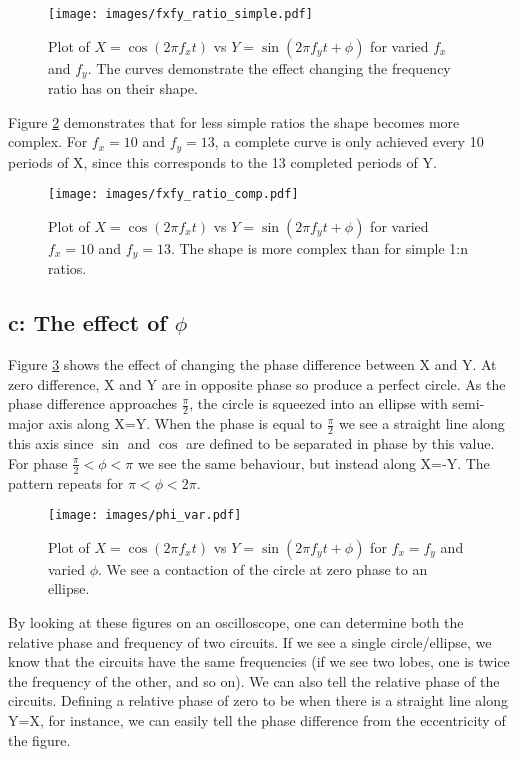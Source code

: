\documentclass{article}
\begin{document}
\begin{figure}[h]
\centering
\texttt{[image: images/fxfy\_ratio\_simple.pdf]}
\caption{Plot of $X = \cos(2\pi f_x t)$ vs $Y = \sin(2\pi f_y t + \phi)$ for varied $f_x$ and $f_y$. The curves demonstrate the effect changing the frequency ratio has on their shape.}
\label{fig:ratiosimp}
\end{figure}

Figure \ref{fig:ratiocomp} demonstrates that for less simple ratios the shape becomes more complex. For $f_x=10$ and $f_y=13$, a complete curve is only achieved every 10 periods of X, since this corresponds to the 13 completed periods of Y.

\begin{figure}[h]
\centering
\texttt{[image: images/fxfy\_ratio\_comp.pdf]}
\caption{Plot of $X = \cos(2\pi f_x t)$ vs $Y = \sin(2\pi f_y t + \phi)$ for varied $f_x=10$ and $f_y=13$. The shape is more complex than for simple 1:n ratios.}
\label{fig:ratiocomp}
\end{figure}
\clearpage

\subsection*{c: The effect of $\phi$}

Figure \ref{fig:phi} shows the effect of changing the phase difference between X and Y. At zero difference, X and Y are in opposite phase so produce a perfect circle. As the phase difference approaches $\frac{\pi}{2}$, the circle is squeezed into an ellipse with semi-major axis along X=Y. When the phase is equal to $\frac{\pi}{2}$ we see a straight line along this axis since $\sin$ and $\cos$ are defined to be separated in phase by this value. For phase $\frac{\pi}{2} < \phi < \pi$ we see the same behaviour, but instead along X=-Y. The pattern repeats for $\pi < \phi < 2\pi$. 
\begin{figure}[h]
\centering
\texttt{[image: images/phi\_var.pdf]}
\caption{Plot of $X = \cos(2\pi f_x t)$ vs $Y = \sin(2\pi f_y t + \phi)$ for $f_x=f_y$ and varied $\phi$. We see a contaction of the circle at zero phase to an ellipse.}
\label{fig:phi}
\end{figure}

By looking at these figures on an oscilloscope, one can determine both the relative phase and frequency of two circuits. If we see a single circle/ellipse, we know that the circuits have the same frequencies (if we see two lobes, one is twice the frequency of the other, and so on). We can also tell the relative phase of the circuits. Defining a relative phase of zero to be when there is a straight line along Y=X, for instance, we can easily tell the phase difference from the eccentricity of the figure.
\end{document}
